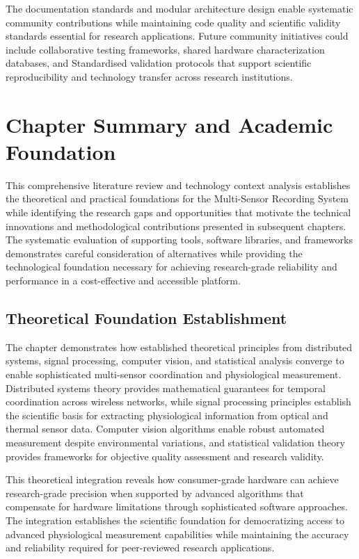 \documentclass[11pt,a4paper]{report}
\begin{document}
The documentation standards and modular architecture design enable systematic community contributions while maintaining code quality and scientific validity standards essential for research applications. Future community initiatives could include collaborative testing frameworks, shared hardware characterization databases, and Standardised validation protocols that support scientific reproducibility and technology transfer across research institutions.

\section{Chapter Summary and Academic Foundation}

This comprehensive literature review and technology context analysis establishes the theoretical and practical foundations for the Multi-Sensor Recording System while identifying the research gaps and opportunities that motivate the technical innovations and methodological contributions presented in subsequent chapters. The systematic evaluation of supporting tools, software libraries, and frameworks demonstrates careful consideration of alternatives while providing the technological foundation necessary for achieving research-grade reliability and performance in a cost-effective and accessible platform.

\subsection{Theoretical Foundation Establishment}

The chapter demonstrates how established theoretical principles from distributed systems, signal processing, computer vision, and statistical analysis converge to enable sophisticated multi-sensor coordination and physiological measurement. Distributed systems theory provides mathematical guarantees for temporal coordination across wireless networks, while signal processing principles establish the scientific basis for extracting physiological information from optical and thermal sensor data. Computer vision algorithms enable robust automated measurement despite environmental variations, and statistical validation theory provides frameworks for objective quality assessment and research validity.

This theoretical integration reveals how consumer-grade hardware can achieve research-grade precision when supported by advanced algorithms that compensate for hardware limitations through sophisticated software approaches. The integration establishes the scientific foundation for democratizing access to advanced physiological measurement capabilities while maintaining the accuracy and reliability required for peer-reviewed research applications.
\end{document}
